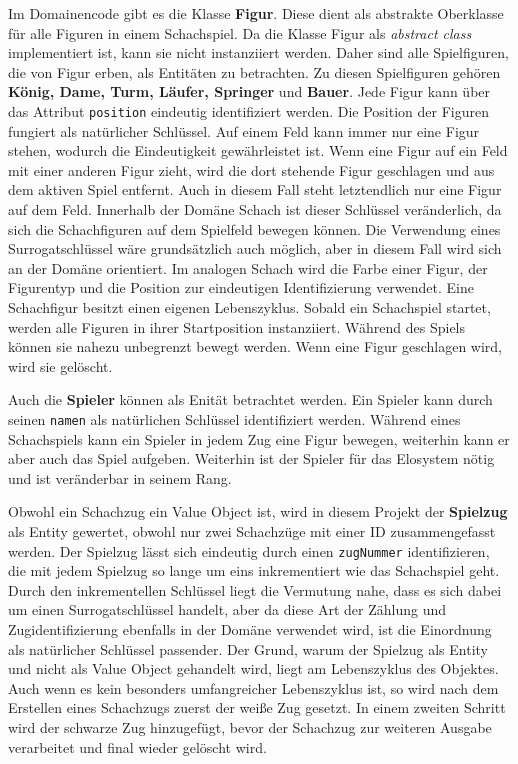 Im Domainencode gibt es die Klasse \textbf{Figur}. 
Diese dient als abstrakte Oberklasse für alle Figuren in einem Schachspiel. 
Da die Klasse Figur als \textit{abstract class} implementiert ist, kann sie nicht instanziiert werden.
Daher sind alle Spielfiguren, die von Figur erben, als Entitäten zu betrachten. 
Zu diesen Spielfiguren gehören \textbf{König, Dame, Turm, Läufer, Springer} und \textbf{Bauer}. 
Jede Figur kann über das Attribut \texttt{position} eindeutig identifiziert werden. 
Die Position der Figuren fungiert als natürlicher Schlüssel. 
Auf einem Feld kann immer nur eine Figur stehen, wodurch die Eindeutigkeit gewährleistet ist. 
Wenn eine Figur auf ein Feld mit einer anderen Figur zieht, wird die dort stehende Figur geschlagen und aus dem aktiven Spiel entfernt. 
Auch in diesem Fall steht letztendlich nur eine Figur auf dem Feld. 
Innerhalb der Domäne \glqq Schach\grqq{} ist dieser Schlüssel veränderlich, da sich die Schachfiguren auf dem Spielfeld bewegen können. 
Die Verwendung eines Surrogatschlüssel wäre grundsätzlich auch möglich, aber in diesem Fall wird sich an der Domäne orientiert.
Im analogen Schach wird die Farbe einer Figur, der Figurentyp und die Position zur eindeutigen Identifizierung verwendet.   
Eine Schachfigur besitzt einen eigenen Lebenszyklus. Sobald ein Schachspiel startet, werden alle Figuren in ihrer Startposition instanziiert. Während des Spiels können sie nahezu unbegrenzt bewegt werden. Wenn eine Figur geschlagen wird, wird sie gelöscht.

Auch die \textbf{Spieler} können als Enität betrachtet werden. 
Ein Spieler kann durch seinen \texttt{namen} als natürlichen Schlüssel identifiziert werden. 
Während eines Schachspiels kann ein Spieler in jedem Zug eine Figur bewegen, weiterhin kann er aber auch das Spiel aufgeben. 
Weiterhin ist der Spieler für das Elosystem nötig und ist veränderbar in seinem Rang. 

Obwohl ein Schachzug ein Value Object ist, wird in diesem Projekt der \textbf{Spielzug} als Entity gewertet, obwohl nur zwei Schachzüge mit einer ID zusammengefasst werden. 
Der Spielzug lässt sich eindeutig durch einen \texttt{zugNummer} identifizieren, die mit jedem Spielzug so lange um eins inkrementiert wie das Schachspiel geht. 
Durch den inkrementellen Schlüssel liegt die Vermutung nahe, dass es sich dabei um einen Surrogatschlüssel handelt, aber da diese Art der Zählung und Zugidentifizierung ebenfalls in der Domäne verwendet wird, ist die Einordnung als natürlicher Schlüssel passender. 
Der Grund, warum der Spielzug als Entity und nicht als Value Object gehandelt wird, liegt am Lebenszyklus des Objektes. 
Auch wenn es kein besonders umfangreicher Lebenszyklus ist, so wird nach dem Erstellen eines Schachzugs zuerst der weiße Zug gesetzt.
In einem zweiten Schritt wird der schwarze Zug hinzugefügt, bevor der Schachzug zur weiteren Ausgabe verarbeitet und final wieder gelöscht wird. 

